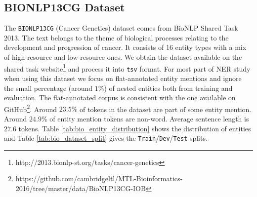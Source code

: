 \subsection{BIONLP13CG Dataset}

The \texttt{BIONLP13CG}\cite{pyysalo2015overview} (Cancer Genetics) dataset comes from BioNLP Shared Task 2013. The text belongs to the theme of biological processes relating to the development and progression of cancer. It consists of 16 entity types with a mix of high-resource and low-resource ones. We obtain the dataset available on the shared task website\footnote{http://2013.bionlp-st.org/tasks/cancer-genetics} and process it into \texttt{tsv} format. For most part of NER study when using this dataset we focus on flat-annotated entity mentions and ignore the small percentage (around $1\%$) of nested entities both from training and evaluation. The flat-annotated corpus is consistent with the one available on GitHub\footnote{https://github.com/cambridgeltl/MTL-Bioinformatics-2016/tree/master/data/BioNLP13CG-IOB}. Around $23.5\%$ of tokens in the dataset are part of some entity mention. Around $24.9\%$ of entity mention tokens are non-word. Average sentence length is $27.6$ tokens. Table \ref{tab:bio_entity_distribution} shows the distribution of entities and Table \ref{tab:bio_dataset_split} gives the \texttt{Train}/\texttt{Dev}/\texttt{Test} splits. 

